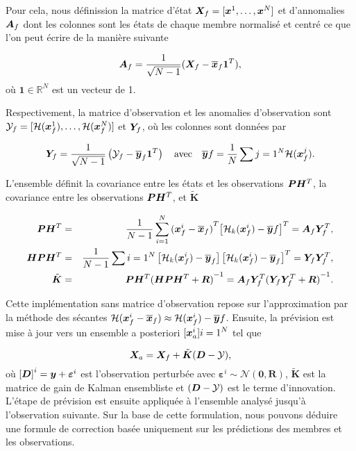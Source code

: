 Pour cela, nous définission la matrice d'état $\bm{X}_f = [\bm{x}^1, \dots, \bm{x}^N]$ et d'annomalies $\bm A_f$ dont les colonnes sont les états de chaque membre normalisé et centré ce que l'on peut écrire de la manière suivante

\begin{equation*}
    \bm A_f = \frac{1}{\sqrt{N - 1}}(\bm X_f - \overline{\bm{x}}_f \bm{1}^T),
\end{equation*}où $\bm{1} \in \mathbb{R}^N$ est un vecteur de 1.

Respectivement, la matrice d'observation et les anomalies d'observation sont $\mathcal Y_f = [\mathcal{H}(\bm{x}^1_f), \dots, \mathcal{H}(\bm{x}^N_f)]$ et $\bm Y_f$, où les colonnes sont données par

\begin{equation*}
    \bm Y_f = \frac{1}{\sqrt{N - 1}} \left(\mathcal Y_f - \overline{\bm{y}}_f \bm{1}^T \right) \quad \text{avec} \quad \overline{\bm{y}}f = \frac{1}{N} \sum{j=1}^{N} \mathcal{H}(\bm{x}^j_f).
\end{equation*}

L'ensemble définit la covariance entre les états et les observations $\bm{P} \bm H^T$, la covariance entre les observations $\bm{P} \bm H^T$, et $\tilde{\bm{K}}$

\begin{eqnarray*}
    \bm{P} \bm H^T &=& \frac{1}{N - 1} \sum_{i = 1}^{N} {(\bm{x}^i_f - \overline{\bm{x}}_f)}^T {\left[ \mathcal{H}_k(\bm{x}^i_f) - \overline{\bm{y}}f\right]}^T = \bm A_f \bm Y_f^T, \\
    \bm H \bm{P} \bm H^T &=& \frac{1}{N -1} \sum{i = 1}^{N}\left[ \mathcal{H}_k(\bm{x}^i_f) - \overline{\bm{y}}_f\right] {\left[ \mathcal{H}_k(\bm{x}^i_f) - \overline{\bm{y}}_f\right]}^T = \bm Y_f \bm Y_f^T,\\
    \tilde{\bm{K}} &=& \bm{P} \bm H^T{(\bm H \bm{P} \bm H^T + \bm R)}^{-1} = \bm A_f \bm Y_f^T {(\bm Y_f \bm Y_f^T + \bm R)}^{-1}.
\end{eqnarray*}

Cette implémentation sans matrice d'observation repose sur l'approximation par la méthode des sécantes $\mathcal{H}(\bm{x}^i_f - \overline{\bm{x}}_f) \approx \mathcal{H} (\bm{x}^i_f) - \overline{\bm{y}}f$.
Ensuite, la prévision est mise à jour vers un ensemble a posteriori ${[\bm{x}^i_a]}{i=1}^{N}$ tel que

\begin{equation} \label{eq:enkf_formula}
    \bm{X}_a = \bm{X}_f + \tilde{\bm{K}} ( \bm{D} - \mathcal{Y}),
\end{equation}
où ${[\bm{D}]}^i = \bm{y} + \bm{\varepsilon}^i$ est l'observation perturbée avec $\bm{\varepsilon}^i \sim \mathcal{N}(\bm{0}, \bm R) $, $\tilde{\bm{K}}$ est la matrice de gain de Kalman ensembliste et $( \bm{D} - \mathcal{Y})$ est le terme d'innovation.
L'étape de prévision est ensuite appliquée à l'ensemble analysé jusqu'à l'observation suivante.
Sur la base de cette formulation, nous pouvons déduire une formule de correction basée uniquement sur les prédictions des membres et les observations.

